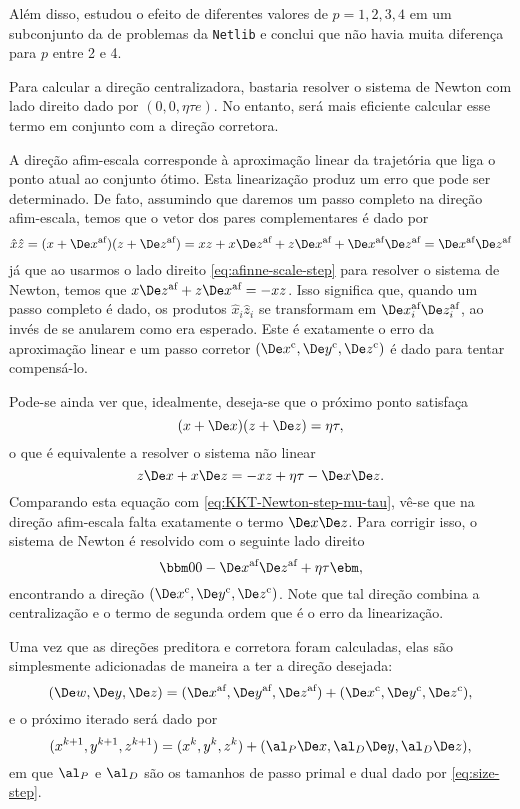 Além disso, \textcite{Mehrotra:1992wr} estudou o efeito de diferentes valores de
$p= 1,2,3,4$ em um subconjunto da de problemas da \texttt{Netlib} e conclui que não havia
 muita diferença para $p$ entre 2 e 4.

Para calcular a direção centralizadora, bastaria resolver o sistema de Newton
com lado direito dado por $(0,0,\eta \tau e)$. No entanto, será mais eficiente
calcular esse termo em conjunto com a direção corretora. 

A direção afim-escala corresponde à aproximação linear da trajetória que liga o
ponto atual ao conjunto ótimo.  Esta linearização produz um erro que pode ser
determinado. De fato, assumindo que daremos um passo completo na direção
afim-escala, temos que o vetor dos pares complementares é  dado por \[
\hat{x}\hat{z} = (x+\dex)(z + \dez) = xz + x\dez + z\dex + \dex
\dez =  \dex\dez \] já que ao usarmos o lado direito
\eqref{eq:afinne-scale-step} para resolver o sistema de Newton, temos que
$x\dez  + z\dex  = -xz$. Isso significa que, quando um passo completo é
dado, os produtos $\hat{x}_i\hat{z}_i$ se transformam em $\dex_i\dez_i $, ao
invés de se anularem como era esperado. Este é exatamente o erro da aproximação linear e
um passo corretor $(\Decox, \Decoy, \Decoz)$ é dado para tentar compensá-lo.

Pode-se ainda ver que, idealmente, deseja-se que o próximo ponto 
satisfaça  \[ (x+\Dex)(z+\Dez) =\eta\tau , \] o que é equivalente a resolver
o sistema não linear \[ z\Dex + x\Dez = -xz + \eta\tau 
 - \Dex\Dez . \] Comparando esta equação com
 \eqref{eq:KKT-Newton-step-mu-tau}, vê-se que na direção afim-escala falta
 exatamente o termo $\Dex\Dez$. Para corrigir isso, o sistema de Newton é
 resolvido com o seguinte lado direito
  \begin{equation}
 \label{eq:corrector-centralizer-step}
 \bbm 0\\ 0 \\ - \dex \dez  + \eta\tau  \ebm, 
 \end{equation}
 encontrando a direção $(\Decox, \Decoy, \Decoz)$. Note que tal direção
 combina a centralização e o termo de segunda ordem   que é o 
 erro da linearização.
 
 Uma vez que as direções preditora e corretora foram calculadas, elas são
 simplesmente adicionadas de maneira a ter a direção desejada:
\begin{equation}
\label{eq:Mehrotra-direction}
 (\Dew, \Dey, \Dez) =  (\dex, \dey, \dez) +  (\Decox, \Decoy,
 \Decoz),
\end{equation}
 e o próximo iterado será dado por
\begin{equation}
\label{eq:Mehrotra-updating}
 (x^{k+1}, y^{k+1},  z^{k+1}) =  (x^{k}, y^{k},  z^{k}) + (\al_P\Dex,\al_D \De
 y, \al_D\Dez),
\end{equation}
 em que $\al_P$ e $\al_D$ são os tamanhos de passo primal e dual dado por
 \eqref{eq:size-step}. 
 
